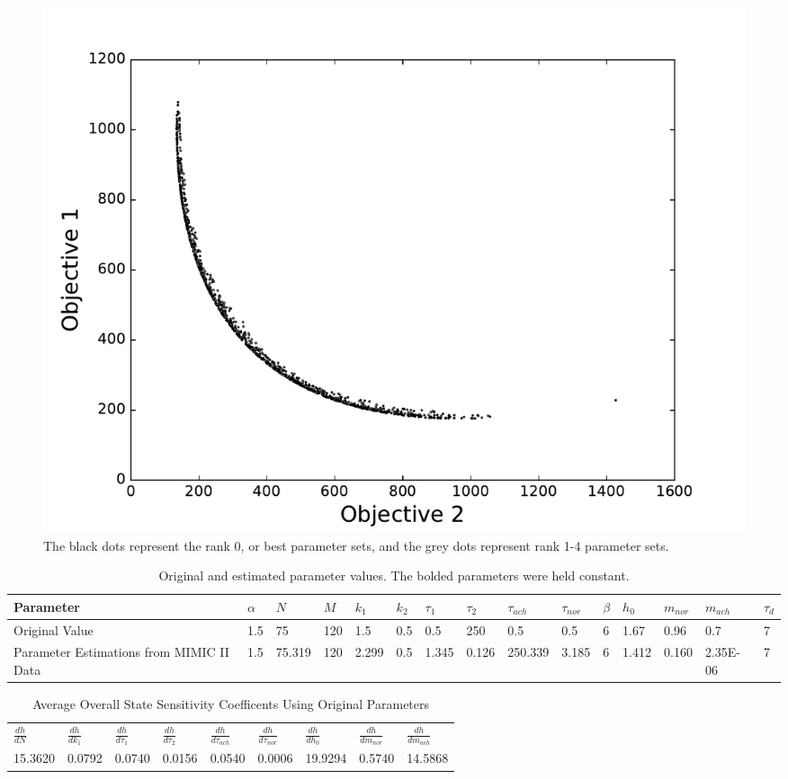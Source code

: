 \documentclass[fleqn,10pt]{wlscirep}
\begin{document}
\begin{figure}[ht]
       \centering
       \includegraphics[width=\linewidth]{figures/TradeOffCurveSlowerCooling}
       \caption{The black dots represent the rank 0, or best parameter sets, and the grey dots represent rank 1-4 parameter sets.}
       \label{fig:tradeoffcurveslower}
\end{figure}
\begin{table}[ht]
\centering
\caption{Original and estimated parameter values. The bolded parameters were held constant.}
\label{tab:SingleParams}
\begin{tabular}{|l|l|l|l|l|l|l|l|l|l|l|l|l|l|l|}
\hline
Parameter                                 & \textbf{$\alpha$} & $N$    & \textbf{$M$} & $k_1$ & \textbf{$k_2$} & $\tau_1$ & $\tau_2$ & $\tau_{ach}$ & $\tau_{nor}$ & \textbf{$\beta$} & $h_0$ & $m_{nor}$ & $m_{ach}$ & \textbf{$\tau_d$} \\ \hline
Original Value                            & 1.5               & 75     & 120          & 1.5   & 0.5            & 0.5      & 250      & 0.5          & 0.5          & 6                & 1.67  & 0.96      & 0.7       & 7                 \\ \hline
Parameter Estimations from MIMIC II  Data & 1.5               & 75.319 & 120          & 2.299 & 0.5            & 1.345    & 0.126    & 250.339      & 3.185        & 6                & 1.412 & 0.160     & 2.35E-06  & 7                 \\ \hline
\end{tabular}
\end{table}
\begin{table}[h]
\centering
\caption{Average Overall State Sensitivity Coefficents Using Original Parameters}
\label{tab:OSSCsoriginalParams}
\begin{tabular}{lllllllll}
$\frac{dh}{dN}$    & $\frac{dh}{dk_1}$  & $\frac{dh}{d\tau_1}$ & $\frac{dh}{d\tau_2}$ &$\frac{dh}{d\tau_{ach}}$ & $\frac{dh}{d\tau_{nor}}$ & $\frac{dh}{dh_0}$   & $\frac{dh}{dm_{nor}}$ & $\frac{dh}{dm_{ach}}$ \\
15.3620 & 0.0792 & 0.0740  & 0.0156  & 0.0540   & 0.0006    & 19.9294 & 0.5740  & 14.5868
\end{tabular}
\end{table} 
\end{document}
